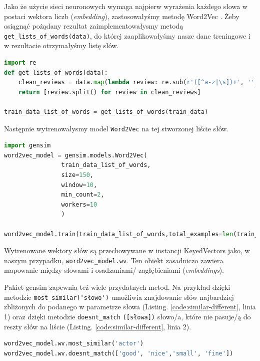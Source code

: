 \noindent Jako że użycie sieci neuronowych wymaga najpierw wyrażenia każdego słowa w postaci wektora liczb (\textit{embedding}), zastosowałyśmy metodę Word2Vec \cite{mikolov2013efficient}. Żeby osiągnąć pożądany rezultat zaimplementowałysmy metodą \verb|get_lists_of_words(data)|, do której zaaplikowałyśmy nasze dane treningowe i w rezultacie otrzymałyśmy listę słów.

\begin{lstlisting}[language=Python,frame=single, breaklines=true, caption=Stworzenie listy słów dla modelu Word2Vec.,label=code:w2v-wordlist]
import re
def get_lists_of_words(data):
	clean_reviews = data.map(lambda review: re.sub(r'([^a-z|\s])+', '', review.lower()))
	return [review.split() for review in clean_reviews]

train_data_list_of_words = get_lists_of_words(train_data)
\end{lstlisting}	

\noindent Następnie wytrenowałysmy model \verb|Word2Vec| na tej stworzonej liście słów.
\begin{lstlisting}[language=Python,frame=single, breaklines=true, caption=Trenowanie modelu Word2Vec.,label=code:w2v]
import gensim
word2vec_model = gensim.models.Word2Vec(
				train_data_list_of_words,
				size=150,  
				window=10, 
				min_count=2, 
				workers=10
				)

word2vec_model.train(train_data_list_of_words,total_examples=len(train_data_list_of_words),epochs=10)
\end{lstlisting}

\noindent Wytrenowane wektory słów są przechowywane w instancji KeyedVectors jako, w naszym przypadku, \verb|word2vec_model.wv|. Ten obiekt zasadniczo zawiera mapowanie między słowami i osadzaniami/ zagłębieniami (\textit{embeddings}).


\noindent Pakiet gensim zapewnia też wiele przydatnych metod. Na przykład dzięki metodzie \verb|most_similar('słowo')| umożliwia znajdowanie słów najbardziej zbliżonych do podanego w parametrze słowa (Listing. \ref{code:similar-different}, linia 1) oraz dzięki metodzie \verb|doesnt_match| \verb|([słowa])| słowo/a, które nie pasuje/ą do reszty słów na liście (Listing. \ref{code:similar-different}, linia 2).

\begin{lstlisting}[language=Python,frame=single, breaklines=true, caption=Znajdowanie najbardziej zbliżonych i nie pasujących słów.,label=code:similar-different]
word2vec_model.wv.most_similar('actor')
word2vec_model.wv.doesnt_match(['good', 'nice','small', 'fine'])
\end{lstlisting}

